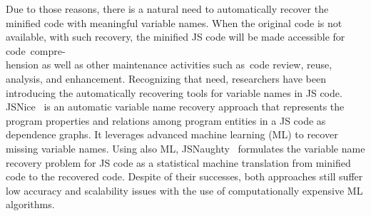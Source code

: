 Due to those reasons, there is a natural need to automatically recover
the minified code with meaningful variable names. When the original
code is not available, with such recovery, the minified JS code will
be made accessible for code~compre-\\hension as well as other maintenance
activities such as~code review, reuse, analysis, and
enhancement. Recognizing that need, researchers have been introducing
the automatically recovering tools for variable names in JS code.
%
JSNice~\cite{JSNice2015} is an automatic variable name recovery
approach that represents the program properties and relations among
program entities in a JS code as dependence graphs.
%
It leverages advanced machine learning (ML) to recover missing
variable names.
%
Using also ML, JSNaughty~\cite{JSNaughty2017}
formulates the variable name recovery problem for JS code as a
statistical machine translation from minified code to the
recovered code. Despite of their successes, both approaches still
suffer low accuracy and scalability issues with the use of
computationally expensive ML algorithms.
